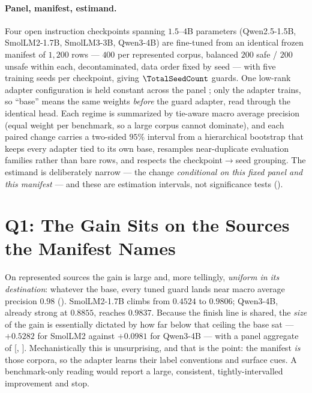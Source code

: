 \documentclass[manuscript,screen,review,anonymous]{acmart}
\begin{document}
\paragraph{Panel, manifest, estimand.} Four open instruction checkpoints spanning $1.5$--$4$B
parameters (Qwen2.5-1.5B, SmolLM2-1.7B, SmolLM3-3B, Qwen3-4B) are fine-tuned from an identical frozen
manifest of $1{,}200$ rows --- $400$ per represented corpus, balanced $200$ safe / $200$ unsafe within
each, decontaminated, data order fixed by seed --- with five training seeds per checkpoint, giving
$\TotalSeedCount$ guards. One low-rank adapter configuration is held constant across the panel
\citep{hu2021lora}; only the adapter trains, so ``base'' means the same weights \emph{before} the guard
adapter, read through the identical head. Each regime is summarized by tie-aware macro average
precision (equal weight per benchmark, so a large corpus cannot dominate), and each paired change
carries a two-sided $95\%$ interval from a hierarchical bootstrap that keeps every adapter tied to its
own base, resamples near-duplicate evaluation families rather than bare rows, and respects the
checkpoint$\to$seed grouping. The estimand is deliberately narrow --- the change \emph{conditional on
this fixed panel and this manifest} --- and these are estimation intervals, not significance tests
().

\section{Q1: The Gain Sits on the Sources the Manifest Names}
\label{sec:finding-source}

\begin{table}[t]\centering\small
\caption{\textbf{Paired base$\to$tuned macro average precision by regime}, reproduced verbatim from
the committed generated artifact. \emph{Rep} $=$ held-back rows from the three corpora named in the
manifest; \emph{Tr} $=$ four corpora held out at the source level. Intervals are two-sided $95\%$
hierarchical bootstrap, conditional on this fixed panel.}
\label{tab:primary}
\resizebox{\linewidth}{!}{}
\end{table}

On represented sources the gain is large and, more tellingly, \emph{uniform in its destination}:
whatever the base, every tuned guard lands near macro average precision $0.98$ ().
SmolLM2-1.7B climbs from $0.4524$ to $0.9806$; Qwen3-4B, already strong at $0.8855$, reaches $0.9837$.
Because the finish line is shared, the \emph{size} of the gain is essentially dictated by how far below
that ceiling the base sat --- $+0.5282$ for SmolLM2 against $+0.0981$ for Qwen3-4B --- with a panel
aggregate of \RepDelta{} [\RepCILower, \RepCIUpper]. Mechanistically this is unsurprising, and that is
the point: the manifest \emph{is} those corpora, so the adapter learns their label conventions and
surface cues. A benchmark-only reading would report a large, consistent, tightly-intervalled
improvement and stop.
\end{document}
